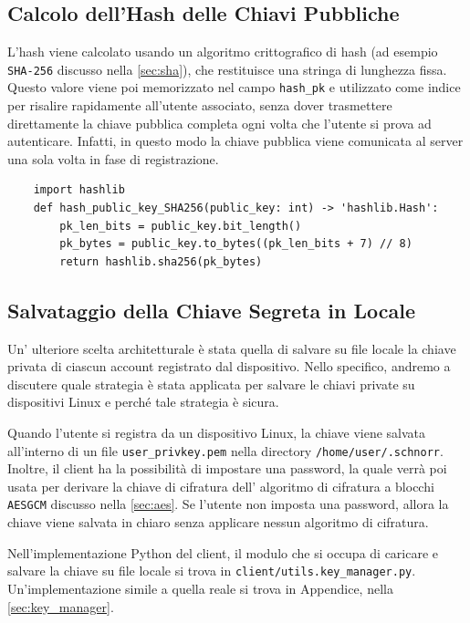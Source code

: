 \subsection{Calcolo dell'Hash delle Chiavi Pubbliche}\label{sec:hash_compute}
L'hash viene calcolato usando un algoritmo crittografico di hash (ad esempio \texttt{SHA-256} discusso nella \autoref{sec:sha}), che restituisce una stringa di lunghezza fissa. Questo valore viene poi memorizzato nel campo \texttt{hash\_pk} e utilizzato come indice per risalire rapidamente all'utente associato, senza dover trasmettere direttamente la chiave pubblica completa ogni volta che l'utente si prova ad autenticare. Infatti, in questo modo la chiave pubblica viene comunicata al server una sola volta in fase di registrazione.
\begin{listing}[!ht]
    \begin{verbatim}
    import hashlib
    def hash_public_key_SHA256(public_key: int) -> 'hashlib.Hash':
        pk_len_bits = public_key.bit_length()
        pk_bytes = public_key.to_bytes((pk_len_bits + 7) // 8)
        return hashlib.sha256(pk_bytes) 
    \end{verbatim}
\caption{Calcolo dell'hash della chiave pubblica in Python}
\end{listing}

\subsection{Salvataggio della Chiave Segreta in Locale}\label{sec:key_manager}

Un' ulteriore scelta architetturale è stata quella di salvare su file locale la chiave privata di ciascun account registrato dal dispositivo. Nello specifico, andremo a discutere quale strategia è stata applicata per salvare le chiavi private su dispositivi Linux e perché tale strategia è sicura.

Quando l'utente si registra da un dispositivo Linux, la chiave viene salvata all'interno di un file \texttt{user\_privkey.pem} nella directory \texttt{/home/user/.schnorr}. Inoltre, il client ha la possibilità di impostare una password, la quale verrà poi usata per derivare la chiave di cifratura dell' algoritmo di cifratura a blocchi \texttt{AESGCM} discusso nella \autoref{sec:aes}. Se l'utente non imposta una password, allora la chiave viene salvata in chiaro senza applicare nessun algoritmo di cifratura.

Nell'implementazione Python del client, il modulo che si occupa di caricare e salvare la chiave su file locale si trova in \texttt{client/utils.key\_manager.py}. Un'implementazione simile a quella reale si trova in Appendice, nella \autoref{sec:key_manager}.

